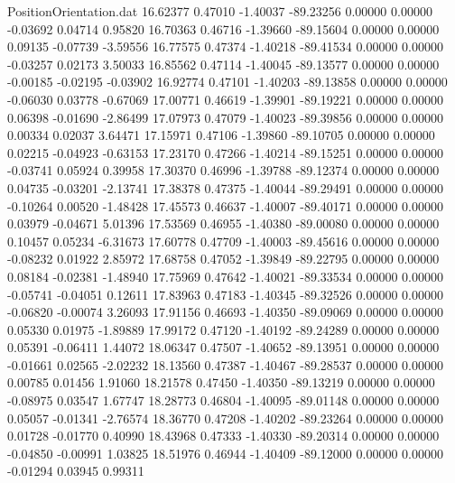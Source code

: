 \begin{filecontents}{PositionOrientation.dat}
  16.62377    0.47010   -1.40037   -89.23256    0.00000    0.00000   -0.03692    0.04714    0.95820
  16.70363    0.46716   -1.39660   -89.15604    0.00000    0.00000    0.09135   -0.07739   -3.59556
  16.77575    0.47374   -1.40218   -89.41534    0.00000    0.00000   -0.03257    0.02173    3.50033
  16.85562    0.47114   -1.40045   -89.13577    0.00000    0.00000   -0.00185   -0.02195   -0.03902
  16.92774    0.47101   -1.40203   -89.13858    0.00000    0.00000   -0.06030    0.03778   -0.67069
  17.00771    0.46619   -1.39901   -89.19221    0.00000    0.00000    0.06398   -0.01690   -2.86499
  17.07973    0.47079   -1.40023   -89.39856    0.00000    0.00000    0.00334    0.02037    3.64471
  17.15971    0.47106   -1.39860   -89.10705    0.00000    0.00000    0.02215   -0.04923   -0.63153
  17.23170    0.47266   -1.40214   -89.15251    0.00000    0.00000   -0.03741    0.05924    0.39958
  17.30370    0.46996   -1.39788   -89.12374    0.00000    0.00000    0.04735   -0.03201   -2.13741
  17.38378    0.47375   -1.40044   -89.29491    0.00000    0.00000   -0.10264    0.00520   -1.48428
  17.45573    0.46637   -1.40007   -89.40171    0.00000    0.00000    0.03979   -0.04671    5.01396
  17.53569    0.46955   -1.40380   -89.00080    0.00000    0.00000    0.10457    0.05234   -6.31673
  17.60778    0.47709   -1.40003   -89.45616    0.00000    0.00000   -0.08232    0.01922    2.85972
  17.68758    0.47052   -1.39849   -89.22795    0.00000    0.00000    0.08184   -0.02381   -1.48940
  17.75969    0.47642   -1.40021   -89.33534    0.00000    0.00000   -0.05741   -0.04051    0.12611
  17.83963    0.47183   -1.40345   -89.32526    0.00000    0.00000   -0.06820   -0.00074    3.26093
  17.91156    0.46693   -1.40350   -89.09069    0.00000    0.00000    0.05330    0.01975   -1.89889
  17.99172    0.47120   -1.40192   -89.24289    0.00000    0.00000    0.05391   -0.06411    1.44072
  18.06347    0.47507   -1.40652   -89.13951    0.00000    0.00000   -0.01661    0.02565   -2.02232
  18.13560    0.47387   -1.40467   -89.28537    0.00000    0.00000    0.00785    0.01456    1.91060
  18.21578    0.47450   -1.40350   -89.13219    0.00000    0.00000   -0.08975    0.03547    1.67747
  18.28773    0.46804   -1.40095   -89.01148    0.00000    0.00000    0.05057   -0.01341   -2.76574
  18.36770    0.47208   -1.40202   -89.23264    0.00000    0.00000    0.01728   -0.01770    0.40990
  18.43968    0.47333   -1.40330   -89.20314    0.00000    0.00000   -0.04850   -0.00991    1.03825
  18.51976    0.46944   -1.40409   -89.12000    0.00000    0.00000   -0.01294    0.03945    0.99311

\end{filecontents}
